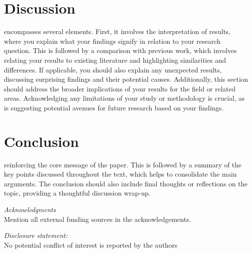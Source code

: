 \documentclass{article}
\begin{document}
\section{Discussion}
\label{sec:discussion}encompasses several elements. 
First, it involves the interpretation of results, where you explain what your findings signify in relation to your research question. 
This is followed by a comparison with previous work, which involves relating your results to existing literature and highlighting similarities and differences. 
If applicable, you should also explain any unexpected results, discussing surprising findings and their potential causes. 
Additionally, this section should address the broader implications of your results for the field or related areas. 
Acknowledging any limitations of your study or methodology is crucial, as is suggesting potential avenues for future research based on your findings.

\section{Conclusion}
\label{sec:conclusion}
reinforcing the core message of the paper. This is followed by a summary of the key points discussed throughout the text, which helps to consolidate the main arguments. The conclusion should also include final thoughts or reflections on the topic, providing a thoughtful discussion wrap-up. 

\hfill

\textit{Acknowledgments} \\Mention all external funding sources in the acknowledgements.

\textit{Disclosure statement:} \\No potential conflict of interest is reported by the authors




\printbibliography
\end{document}
